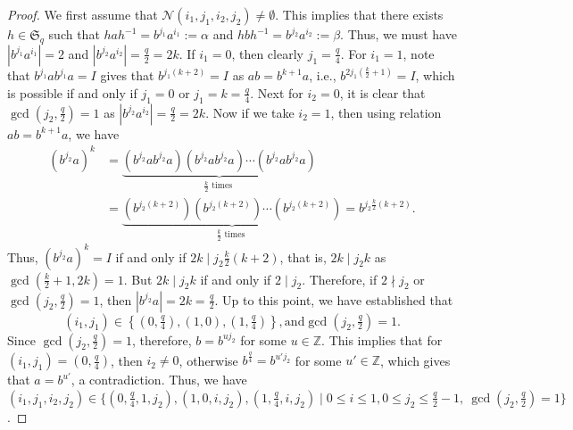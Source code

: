 \documentclass[11pt]{amsart}
\theoremstyle{plain}
\numberwithin{equation}{section}
\begin{document}
\begin{proof}
 We first assume that $\mathcal{N}(i_1,j_1,i_2,j_2)\neq \emptyset$. This implies that there exists $h \in \mathfrak{S}_q$ such that $hah^{-1}=b^{j_1}a^{i_1}:=\alpha$ and $hbh^{-1}=b^{j_2}a^{i_2}:=\beta$. Thus, we must have $|b^{j_1}a^{i_1}|=2$ and $|b^{j_2}a^{i_2}|=\frac{q}{2}=2k$. If $i_1=0$, then clearly $j_1=\frac{q}{4}$. For $i_1=1$, note that $b^{j_1}ab^{j_1}a=I$ gives that $b^{j_1(k+2)}=I$ as $ab=b^{k+1}a$, i.e., $b^{2j_1(\frac{k}{2}+1)}=I$, which is possible if and only if $j_1=0$ or $j_1=k=\frac{q}{4}$. Next for $i_2=0$, it is clear that $\gcd(j_2,\frac{q}{2})=1$ as $|b^{j_2}a^{i_2}|=\frac{q}{2}=2k$. Now if we take $i_2=1$, then using relation $ab=b^{k+1}a$, we have 
\begin{equation*}
\begin{split}
(b^{j_2}a)^{k}&=\underbrace{(b^{j_2}ab^{j_2}a)(b^{j_2}ab^{j_2}a)\cdots(b^{j_2}ab^{j_2}a)}_{ \frac{k}{2} \text{ times }}\\
&=\underbrace{(b^{j_2(k+2)})(b^{j_2(k+2)})\cdots(b^{j_2(k+2)})}_{ \frac{k}{2} \text{ times }}=b^{j_2\frac{k}{2}(k+2)}.
\end{split}
\end{equation*}
Thus, $(b^{j_2}a)^{k}=I$ if and only if $2k \mid j_2\frac{k}{2}(k+2)$, that is, $2k \mid j_2k$ as $\gcd(\frac{k}{2}+1,2k)=1$. But $2k \mid j_2k$ if and only if $2 \mid j_2$. Therefore, if $2 \nmid j_2$ or $\gcd(j_2,\frac{q}{2})=1$, then $|b^{j_2}a|=2k=\frac{q}{2}$. Up to this point, we have established that 
\[
(i_1, j_1) \in \left\{ \left(0, \tfrac{q}{4}\right), (1, 0), \left(1, \tfrac{q}{4}\right) \right\},
\text{and} 
 \gcd\!\left(j_2, \tfrac{q}{2}\right) = 1.
\]
Since $\gcd(j_2,\frac{q}{2})=1$, therefore, $b=b^{uj_2}$ for some $u \in \mathbb{Z}$. This implies that for $(i_1, j_1)=\left(0, \tfrac{q}{4}\right)$, then $i_2 \neq 0$, otherwise $b^{\frac{q}{4}}=b^{u'j_2}$ for some $u' \in \mathbb{Z}$, which gives that $a=b^{u'}$, a contradiction. Thus, we have $(i_1,j_1,i_2,j_2) \in \{(0,\frac{q}{4},1,j_2), (1,0,i,j_2), (1,\frac{q}{4},i,j_2) \mid  0 \leq i \leq 1, 0 \leq j_2 \leq \frac{q}{2}-1, ~\gcd(j_2,\frac{q}{2})=1\}$.






\end{proof}
\end{document}
